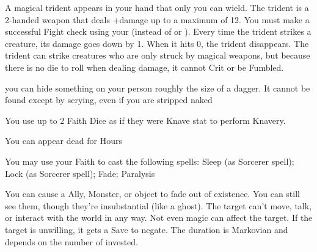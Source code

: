 {A magical trident appears in your hand that only you can wield.  The trident is a 2-handed weapon that deals \DICE+\DICE damage up to a maximum of 12. You must make a successful Fight check using your \FOC (instead of \VIG or \DEX). Every time the trident strikes a creature, its damage goes down by 1.  When it hits 0, the trident disappears.  The trident can strike creatures who are only struck by magical weapons, but because there is no die to roll when dealing damage, it cannot Crit or be Fumbled. 



\GOD[
Name=Loki,
Link=small-god-loki,
GodOf=King of Thieves,
Holy=an image of two snakes circling one another to form an 'S' shape and biting the tail of the other
]


you can hide something on your person roughly the size of a dagger. It cannot be found except by scrying, even if you are stripped naked


You use up to 2 Faith Dice as if they were Knave {stat} to perform Knavery.




\GOD[
Name=Nyx,
Link=small-god-nyx,
GodOf=Cousin of Death,
Holy=a black lace shroud
]


You can appear dead for Hours


You may use your Faith to cast the following spells: Sleep (as Sorcerer spell); Lock (as Sorcerer spell); Fade; Paralysis

\LITURGY [
  Name= Fade,
  Link= nyx-liturgy-fade,
  Paradigm= Mind ,
  Save=  Y (negates) ,
  Duration= Markovian ,
  Counter=  n/a  ,
  Keywords= None ,
  Target=   Nearby creature or object
]



You can cause a Ally, Monster, or object to fade out of existence.  You can still see them, though they're insubstantial (like a ghost).  The target can't move, talk, or interact with the world in any way.  Not even magic can affect the target.  If the target is unwilling, it gets a Save to negate.  The duration is Markovian and depends on the number of \DICE invested.

\LITURGY [
  Name= Paralysis,
  Link=nyx-liturgy-paralysis,
  Paradigm= Mind ,
  Save=  Y (negates) ,
  Duration= Markovian ,
  Counter=  n/a  ,
  Keywords= Splittable ,
  Target=   Close or Nearby Creature
]



}
